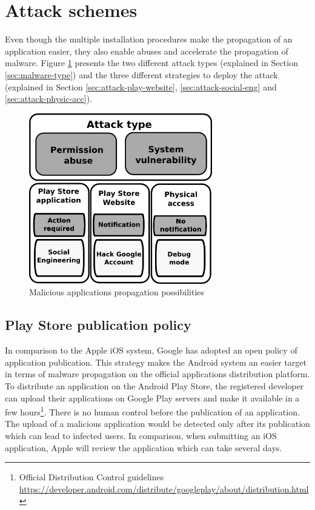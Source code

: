 \section{Attack schemes}
\label{sec:and-attack-scheme}

Even though the multiple installation procedures make the propagation of an application easier, they also enable abuses and accelerate the propagation of malware.
Figure \ref{fig:secu-graph} presents the two different attack types (explained in Section \ref{sec:malware-type}) and the three different strategies to deploy the attack (explained in Section \ref{sec:attack-play-website}, \ref{sec:attack-social-eng} and \ref{sec:attack-physic-acc}).

\begin{figure}[h]
  \centering
  \includegraphics[width=8cm]{images/secu-graph.png}
  \caption{Malicious applications propagation possibilities}
  \label{fig:secu-graph}
\end{figure}

\subsection{Play Store publication policy}
\label{sec:playstore-publication-policy}

In comparison to the Apple iOS system, Google has adopted an open policy of application publication.
This strategy makes the Android system an easier target in terms of malware propagation on the official applications distribution platform.\\

To distribute an application on the Android Play Store, the registered developer can upload their applications on Google Play servers and make it available in a few hours\footnote{Official Distribution Control guidelines \url{https://developer.android.com/distribute/googleplay/about/distribution.html}}.
There is no human control before the publication of an application.
The upload of a malicious application would be detected only after its publication which can lead to infected users.
In comparison, when submitting an iOS application, Apple will review the application which can take several days.\\

